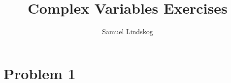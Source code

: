 \documentclass{article}
\theoremstyle{plain}
\theoremstyle{definition}
\begin{document}
\title{Complex Variables Exercises}
\author{Samuel Lindskog}
\maketitle

\setcounter{section}{1}

\section*{Problem 1}
\end{document}
